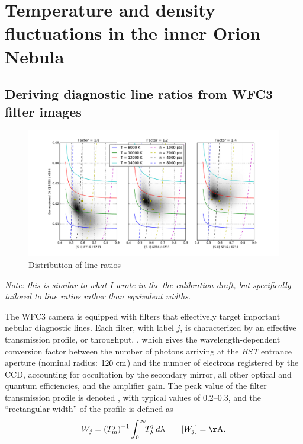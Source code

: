 \documentclass[preprint, 10pt]{aastex}
\begin{document}
\section{Temperature and density fluctuations in the inner Orion Nebula}
\label{sec:fluct}



\subsection{Deriving diagnostic line ratios from WFC3 filter images}
\label{sec:filters}
\begin{figure}
  \centering
  \includegraphics[width=\linewidth]{bivar_rsii_rnii_multifactor}
  \caption{Distribution of line ratios}
  \label{fig:line-ratios}
\end{figure}

\textit{Note: this is similar to what I wrote in the the calibration
  draft, but specifically tailored to line ratios rather than
  equivalent widths.}

The WFC3 camera is equipped with filters that effectively target
important nebular diagnostic lines.  Each filter, with label \(j\), is
characterized by an effective transmission profile, or throughput,
, which gives the wavelength-dependent conversion factor
between the number of photons arriving at the \textit{HST} entrance
aperture (nominal radius: \(120\ \mathrm{cm}\)) and the number of electrons
registered by the CCD, accounting for occultation by the secondary
mirror, all other optical and quantum efficiencies, and the amplifier
gain.  The peak value of the filter transmission profile is denoted
, with typical values of 0.2--0.3, and the ``rectangular
width'' of the profile is defined as
\begin{equation}
  \label{eq:width}
  W_j = (\Tmax{j})^{-1} \int_0^\infty \!\!\Tlam{j}\, d\lambda 
  \quad\quad [W_j] = \U{\AA}.
\end{equation}
\end{document}
